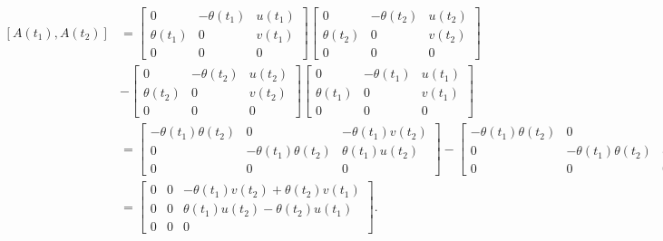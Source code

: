 \begin{equation*}
  \begin{aligned}
    \left[ A(t_1), A(t_2) \right] & = \begin{bmatrix}
      0 & -\theta(t_1) & u(t_1) \\ \theta(t_1) & 0 & v(t_1) \\ 0 & 0 & 0
    \end{bmatrix} \begin{bmatrix}
      0 & -\theta(t_2) & u(t_2) \\ \theta(t_2) & 0 & v(t_2) \\ 0 & 0 & 0
    \end{bmatrix} \\
                                 & - \begin{bmatrix}
      0 & -\theta(t_2) & u(t_2) \\ \theta(t_2) & 0 & v(t_2) \\ 0 & 0 & 0
    \end{bmatrix} \begin{bmatrix}
      0 & -\theta(t_1) & u(t_1) \\ \theta(t_1) & 0 & v(t_1) \\ 0 & 0 & 0
    \end{bmatrix} \\
                                  & = \begin{bmatrix}
      -\theta(t_1) \theta(t_2) & 0                        & -\theta(t_1)v(t_2) \\
      0                        & -\theta(t_1) \theta(t_2) & \theta(t_1)u(t_2)  \\
      0                        & 0                        & 0
    \end{bmatrix} - \begin{bmatrix}
      -\theta(t_1) \theta(t_2) & 0                        & -\theta(t_2) v(t_1) \\
      0                        & -\theta(t_1) \theta(t_2) & \theta(t_2) u(t_1)  \\
      0                        & 0                        & 0
    \end{bmatrix}                                                       \\
                                  & = \begin{bmatrix}
      0 & 0 & -\theta(t_1) v(t_2) + \theta(t_2) v(t_1) \\
      0 & 0 & \theta(t_1) u(t_2) - \theta(t_2) u(t_1)  \\
      0 & 0 & 0
    \end{bmatrix}.
  \end{aligned}
\end{equation*}

